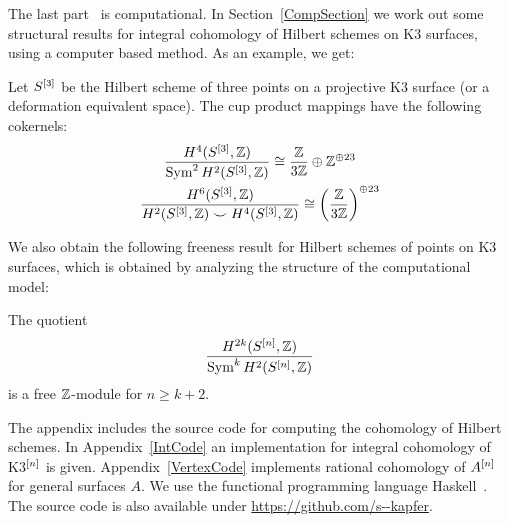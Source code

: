 The last part~\cite{Kapfer2} is computational. In Section~\ref{CompSection} we work out some structural results for integral cohomology of Hilbert schemes on K3 surfaces, using a computer based method. As an example, we get:
{
\renewcommand{\thetheorem}{\!\!s~\ref{p22} and~\ref{p24}}
\begin{proposition}
Let $S^{[3]}$ be the Hilbert scheme of three points on a projective K3 surface (or a deformation equivalent space).
The cup product mappings have the following cokernels:
\begin{gather*}
\frac{H^4(S^{[3]},\mathbb{Z})}{\operatorname{Sym}^2 H^2(S^{[3]},\mathbb{Z})}  \cong \frac{\mathbb{Z}}{3\mathbb{Z}} \oplus \mathbb{Z}^ {\oplus 23}\\
\frac{H^6(S^{[3]},\mathbb{Z})}{H^2(S^{[3]},\mathbb{Z})\smile H^4(S^{[3]},\mathbb{Z})} \cong \left(\frac{\mathbb{Z}}{3\mathbb{Z}}\right)^{\oplus 23}
\end{gather*}
\end{proposition}
\addtocounter{theorem}{-1}
}
We also obtain the following freeness result for Hilbert schemes of points on K3 surfaces, which is obtained by analyzing the structure of the computational model:
{
\renewcommand{\thetheorem}{\ref{freeness}}
\begin{theorem}
The quotient
$$
 \frac{H^{2k}(S^{[n]},\mathbb{Z})}{\operatorname{Sym}^k H^{2}(S^{[n]},\mathbb{Z})}
$$
is a free $\mathbb{Z}$-module for $n\geq k+2$.
\end{theorem}
\addtocounter{theorem}{-1}
}
The appendix includes the source code for computing the cohomology of Hilbert schemes. In Appendix~\ref{IntCode} an implementation for integral cohomology of K3$^{[n]}$ is given. 
Appendix~\ref{VertexCode} implements rational cohomology of $A^{[n]}$ for general surfaces $A$. 
We use the functional programming language Haskell~\cite{haskell98}. 
The source code is also available under \url{https://github.com/s--kapfer}.
\vspace{5pt}



